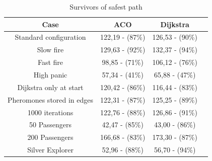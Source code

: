 \begin{table}[ht]
\caption{Survivors of safest path} 				%
\centering										%
\begin{tabular}{c c c c}						%
\hline
\hline 											%
Case & ACO & Dijkstra \\[0.5ex]%
\hline											%
Standard configuration & 122,19 - (87\%) & 126,53 - (90\%) \\
Slow fire & 129,63 - (92\%) & 132,37 - (94\%) \\
Fast fire & 98,85 - (71\%) & 106,12 - (76\%) \\
High panic & 57,34 - (41\%) & 65,88 - (47\%) \\
Dijkstra only at start & 120,42 - (86\%) & 116,44 - (83\%) \\
Pheromones stored in edges & 122,31 - (87\%) & 125,25 - (89\%) \\
1000 iterations & 122,76 - (88\%) & 126,86 - (91\%) \\
50 Passengers & 42,47 - (85\%) & 43,00 - (86\%) \\
200 Passengers & 166,68 - (83\%) & 173,30 - (87\%) \\ 
Silver Explorer & 52,96 - (88\%) & 56,70 - (94\%) \\ [1ex]						%
\hline														%

\end{tabular}
\label{table:tableSafest}								
\end{table}


